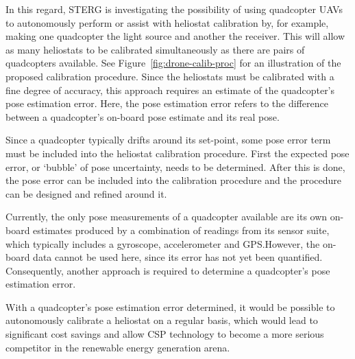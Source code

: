 In this regard, STERG is investigating the possibility of using quadcopter UAVs to autonomously perform or assist with heliostat calibration by, for example, making one quadcopter the light source and another the receiver. This will allow as many heliostats to be calibrated simultaneously as there are pairs of quadcopters available. See Figure~\ref{fig:drone-calib-proc} for an illustration of the proposed calibration procedure. Since the heliostats must be calibrated with a fine degree of accuracy, this approach requires an estimate of the quadcopter's pose estimation error. Here, the pose estimation error refers to the difference between a quadcopter's on-board pose estimate and its real pose.

Since a quadcopter typically drifts around its set-point, some pose error term must be included into the heliostat calibration procedure. First the expected pose error, or `bubble' of pose uncertainty, needs to be determined. After this is done, the pose error can be included into the calibration procedure and the procedure can be designed and refined around it.

Currently, the only pose measurements of a quadcopter available are its own on-board estimates produced by a combination of readings from its sensor suite, which typically includes a gyroscope, accelerometer and GPS.\@ However, the on-board data cannot be used here, since its error has not yet been quantified. Consequently, another approach is required to determine a quadcopter's pose estimation error. 

With a quadcopter's pose estimation error determined, it would be possible to autonomously calibrate a heliostat on a regular basis, which would lead to significant cost savings and allow CSP technology to become a more serious competitor in the renewable energy generation arena.




